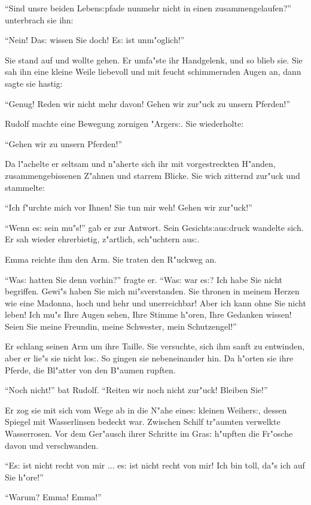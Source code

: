 \documentclass[oneside,12pt]{book}
\newcommand{\s}{s:}%
\begin{document}
"`Sind unsre beiden Leben{\s}pfade nunmehr nicht in einen
zusammengelaufen?"' unterbrach sie ihn:

"`Nein! Da{\s} wissen Sie doch! E{\s} ist unm"oglich!"'

Sie stand auf und wollte gehen. Er umfa"ste ihr Handgelenk, und so
blieb sie. Sie sah ihn eine kleine Weile liebevoll und mit feucht
schimmernden Augen an, dann sagte sie hastig:

"`Genug! Reden wir nicht mehr davon! Gehen wir zur"uck zu unsern
Pferden!"'

Rudolf machte eine Bewegung zornigen "Arger{\s}. Sie wiederholte:

"`Gehen wir zu unsern Pferden!"'

Da l"achelte er seltsam und n"aherte sich ihr mit vorgestreckten
H"anden, zusammengebissenen Z"ahnen und starrem Blicke. Sie wich
zitternd zur"uck und stammelte:

"`Ich f"urchte mich vor Ihnen! Sie tun mir weh! Gehen wir zur"uck!"'

"`Wenn e{\s} sein mu"s!"' gab er zur Antwort. Sein
Gesicht{\s}au{\s}druck wandelte sich. Er sah wieder ehrerbietig,
z"artlich, sch"uchtern au{\s}.

Emma reichte ihm den Arm. Sie traten den R"uckweg an.

"`Wa{\s} hatten Sie denn vorhin?"' fragte er. "`Wa{\s} war e{\s}?
Ich habe Sie nicht begriffen. Gewi"s haben Sie mich mi"sverstanden.
Sie thronen in meinem Herzen wie eine Madonna, hoch und hehr und
unerreichbar! Aber ich kann ohne Sie nicht leben! Ich mu"s Ihre
Augen sehen, Ihre Stimme h"oren, Ihre Gedanken wissen! Seien Sie
meine Freundin, meine Schwester, mein Schutzengel!"'

Er schlang seinen Arm um ihre Taille. Sie versuchte, sich ihm
sanft zu entwinden, aber er lie"s sie nicht lo{\s}. So gingen sie
nebeneinander hin. Da h"orten sie ihre Pferde, die Bl"atter von
den B"aumen rupften.

"`Noch nicht!"' bat Rudolf. "`Reiten wir noch nicht zur"uck!
Bleiben Sie!"'

Er zog sie mit sich vom Wege ab in die N"ahe eine{\s} kleinen
Weiher{\s}, dessen Spiegel mit Wasserlinsen bedeckt war. Zwischen
Schilf tr"aumten verwelkte Wasserrosen. Vor dem Ger"ausch ihrer
Schritte im Gra{\s} h"upften die Fr"osche davon und verschwanden.

"`E{\s} ist nicht recht von mir ... e{\s} ist nicht recht von mir!
Ich bin toll, da"s ich auf Sie h"ore!"'

"`Warum? Emma! Emma!"'
\end{document}
